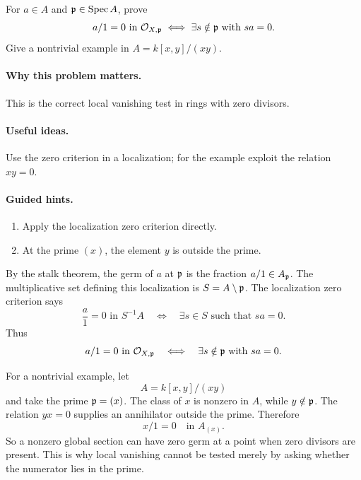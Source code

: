 \begin{problem}\label{prob:vi17-p17}
For $a\in A$ and $\mathfrak p\in\operatorname{Spec} A$, prove
\[a/1=0\text{ in }\mathcal O_{X,\mathfrak p}\iff\exists s\notin\mathfrak p\text{ with }sa=0.\]
Give a nontrivial example in $A=k[x,y]/(xy)$.
\end{problem}

\ifdefined\FullProblemDossiers
\paragraph{Why this problem matters.}
This is the correct local vanishing test in rings with zero divisors.

\paragraph{Useful ideas.}
Use the zero criterion in a localization; for the example exploit the relation $xy=0$.

\paragraph{Guided hints.}
\begin{enumerate}
\item Apply the localization zero criterion directly.
\item At the prime $(x)$, the element $y$ is outside the prime.
\end{enumerate}

\begin{solution}
By the stalk theorem, the germ of $a$ at $\mathfrak p$ is the fraction $a/1\in A_{\mathfrak p}$.  The multiplicative set defining this localization is $S=A\setminus\mathfrak p$.  The localization zero criterion says
\[
\frac a1=0\text{ in }S^{-1}A
\quad\Longleftrightarrow\quad
\exists s\in S\text{ such that }sa=0.
\]
Thus
\[
a/1=0\text{ in }\mathcal O_{X,\mathfrak p}
\quad\Longleftrightarrow\quad
\exists s\notin\mathfrak p\text{ with }sa=0.
\]

For a nontrivial example, let
\[
A=k[x,y]/(xy)
\]
and take the prime $\mathfrak p=(x)$.  The class of $x$ is nonzero in $A$, while $y\notin\mathfrak p$.  The relation $yx=0$ supplies an annihilator outside the prime.  Therefore
\[
x/1=0\quad\text{in }A_{(x)}.
\]
So a nonzero global section can have zero germ at a point when zero divisors are present.  This is why local vanishing cannot be tested merely by asking whether the numerator lies in the prime.
\end{solution}



